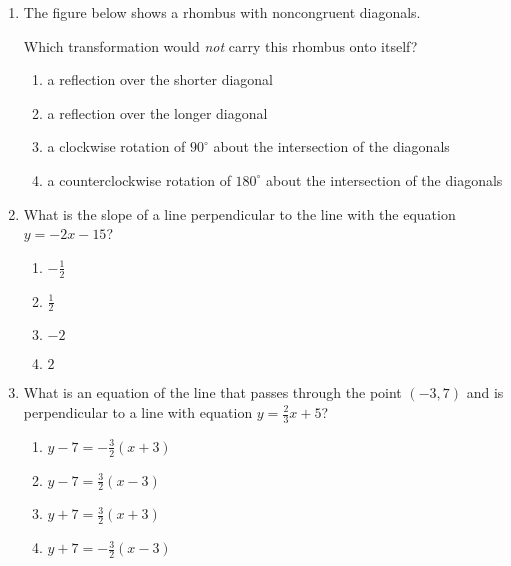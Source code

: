 \begin{enumerate}
\item The figure below shows a rhombus with noncongruent diagonals.
  \begin{center}
  \end{center}
  Which transformation would \emph{not} carry this rhombus onto itself?
    \begin{enumerate}
      \item a reflection over the shorter diagonal
      \item a reflection over the longer diagonal
      \item a clockwise rotation of $90^\circ$ about the intersection of the
      diagonals
      \item a counterclockwise rotation of $180^\circ$ about the intersection of the
      diagonals
    \end{enumerate}
  
\item What is the slope of a line perpendicular to the line with the equation $y=-2x-15$?
  \begin{multicols}{2}
    \begin{enumerate}
      \item $-\frac{1}{2}$
      \item $\frac{1}{2}$ 
      \item $-2$
      \item $2$
    \end{enumerate}
  \end{multicols}

\item What is an equation of the line that passes through the point $(-3,7)$ and is perpendicular to a line with equation $y=\frac{2}{3}x+5$?
  \begin{multicols}{2}
    \begin{enumerate}
      \item $y-7=-\frac{3}{2}(x+3)$
      \item $y-7=\frac{3}{2}(x-3)$ 
      \item $y+7=\frac{3}{2}(x+3)$
      \item $y+7=-\frac{3}{2}(x-3)$
    \end{enumerate}
  \end{multicols}


\end{enumerate}
